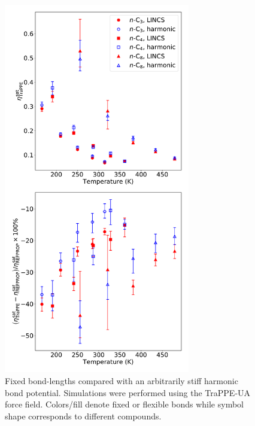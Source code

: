 \documentclass[preprint,review,12pt]{elsarticle}
\begin{document}
	\begin{figure}[htb!]
		\centering
		\includegraphics[width=3.2in]{nAlkanes_TraPPE_BondType.pdf}
		\caption{Fixed bond-lengths compared with an arbitrarily stiff harmonic bond potential. Simulations were performed using the TraPPE-UA force field. Colors/fill denote fixed or flexible bonds while symbol shape corresponds to different compounds.}
		\label{fig:fixed_flexible}
	\end{figure} 

%	
%	
	
\end{document}
